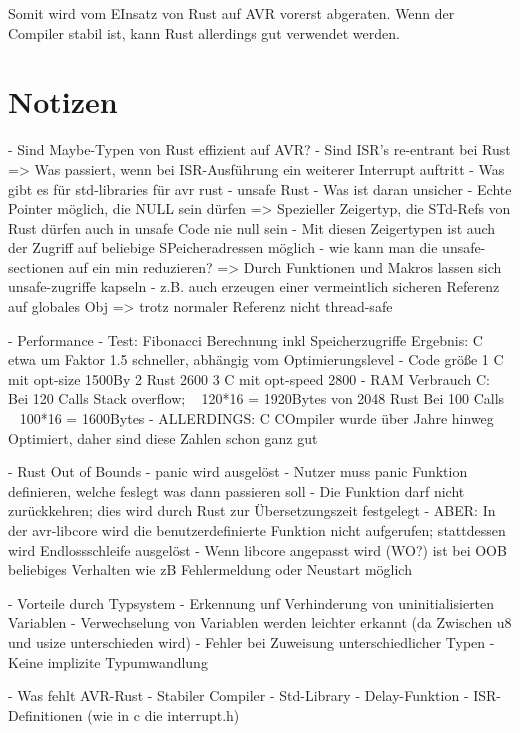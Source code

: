 \documentclass
[ 12pt,
  parskip=half %
]{scrreprt}
\begin{document}
Somit wird vom EInsatz von Rust auf AVR vorerst abgeraten. Wenn der Compiler stabil ist, kann Rust allerdings gut verwendet werden.

\chapter{Notizen}

- Sind Maybe-Typen von Rust effizient auf AVR?
- Sind ISR's re-entrant bei Rust
	=> Was passiert, wenn bei ISR-Ausführung ein weiterer Interrupt auftritt
- Was gibt es für std-libraries für avr rust
- unsafe Rust
	- Was ist daran unsicher
		- Echte Pointer möglich, die NULL sein dürfen
			=> Spezieller Zeigertyp, die STd-Refs von Rust dürfen auch in unsafe Code nie null sein
		- Mit diesen Zeigertypen ist auch der Zugriff auf beliebige SPeicheradressen möglich
	- wie kann man die unsafe-sectionen auf ein min reduzieren?
	=> Durch Funktionen und Makros lassen sich unsafe-zugriffe kapseln
	- z.B. auch erzeugen einer vermeintlich sicheren Referenz auf globales Obj
		=> trotz normaler Referenz nicht thread-safe
	
- Performance
	- Test: Fibonacci Berechnung inkl Speicherzugriffe
		Ergebnis: C etwa um Faktor 1.5 schneller, abhängig vom Optimierungslevel
	- Code größe
		1 C mit opt-size	1500By
		2 Rust				2600
		3 C mit opt-speed	2800
	- RAM Verbrauch
		C: Bei 120 Calls Stack overflow; ~ 120*16 = 1920Bytes von 2048
		Rust Bei 100 Calls			~ 100*16  = 1600Bytes
	- ALLERDINGS: C COmpiler wurde über Jahre hinweg Optimiert, daher sind diese Zahlen schon ganz gut
	
- Rust Out of Bounds
	- panic wird ausgelöst
	- Nutzer muss panic Funktion definieren, welche feslegt was dann passieren soll
	- Die Funktion darf nicht zurückkehren; dies wird durch Rust zur Übersetzungszeit festgelegt
	- ABER: In der avr-libcore wird die benutzerdefinierte Funktion nicht aufgerufen; stattdessen wird Endlossschleife ausgelöst
	- Wenn libcore angepasst wird (WO?) ist bei OOB beliebiges Verhalten wie zB Fehlermeldung oder Neustart möglich
	
- Vorteile durch Typsystem
	- Erkennung unf Verhinderung von uninitialisierten  Variablen
	- Verwechselung von Variablen werden leichter erkannt 
		(da Zwischen u8 und usize unterschieden wird)
	- Fehler bei Zuweisung unterschiedlicher Typen - Keine implizite Typumwandlung
	
- Was fehlt AVR-Rust
	- Stabiler Compiler
	- Std-Library
		- Delay-Funktion
		- ISR-Definitionen (wie in c die interrupt.h) 
\end{document}
